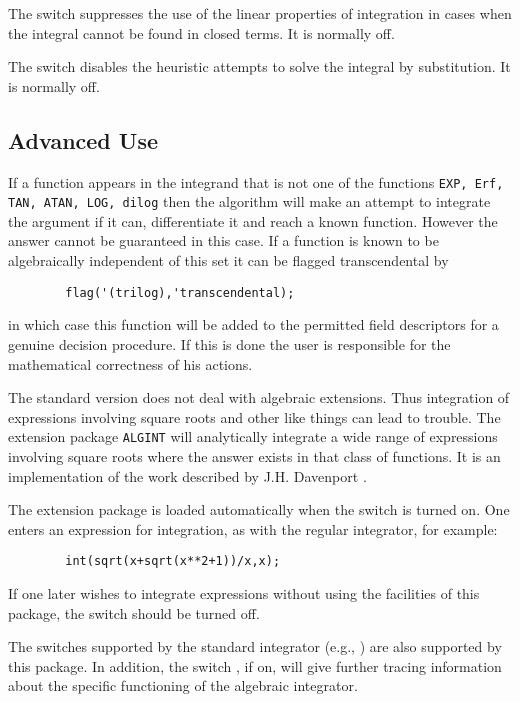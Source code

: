 The switch  suppresses the use of the linear properties of
integration in cases when the integral cannot be found in closed terms.
It is normally off.

The switch  disables the heuristic attempts to solve
the integral by substitution. It is normally off.

\subsection{Advanced Use}
\hypertarget{operator:ERF}{}

If a function appears in the integrand that is not one of the functions
\texttt{EXP, Erf, TAN, ATAN, LOG, dilog}
then the algorithm will make an
attempt to integrate the argument if it can, differentiate it and reach a
known function.  However the answer cannot be guaranteed in this case.  If
a function is known to be algebraically independent of this set it can be
flagged transcendental by
\begin{verbatim}
        flag('(trilog),'transcendental);
\end{verbatim}
in which case this function will be added to the permitted field
descriptors for a genuine decision procedure. If this is done the user is
responsible for the mathematical correctness of his actions.


The standard version does not deal with algebraic extensions. Thus
integration of expressions involving square roots and other like things
can lead to trouble.  The extension package \texttt{ALGINT} 
will analytically integrate a wide range of
expressions involving square roots where the answer exists in that class
of functions. It is an implementation of the work described by J.H.
Davenport \cite{Davenport:81}.

\hypertarget{switch:ALGINT}{}
The extension package is loaded automatically when the switch 
is turned on.
One enters an expression for integration, as with the regular integrator,
for example:
\begin{verbatim}
        int(sqrt(x+sqrt(x**2+1))/x,x);
\end{verbatim}
If one later wishes to integrate expressions without using the facilities of
this package, the switch   should be turned
off.

\hypertarget{switch:TRA}{}
The switches supported by the standard integrator (e.g., )
 are also supported by this package.  In addition, the
switch ,  if on, will give further tracing
information about the specific functioning of the algebraic integrator.



